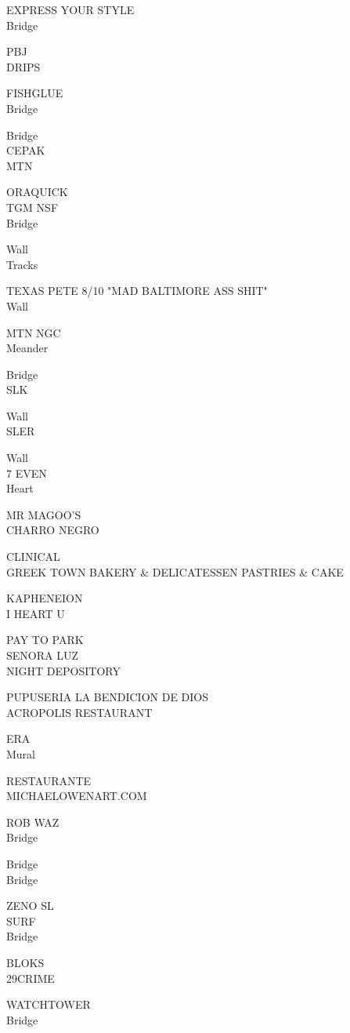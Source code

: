 \documentclass[10pt,letterpaper]{article}
\begin{document}
EXPRESS YOUR STYLE\\
Bridge

PBJ\\
DRIPS

FISHGLUE\\
Bridge

Bridge\\
CEPAK\\
MTN

ORAQUICK\\
TGM NSF\\
Bridge

Wall\\
Tracks

TEXAS PETE 8/10 "MAD BALTIMORE ASS SHIT"\\
Wall

MTN NGC\\
Meander

Bridge\\
SLK

Wall\\
SLER

Wall\\
7 EVEN\\
Heart

MR MAGOO'S\\
CHARRO NEGRO

CLINICAL\\
GREEK TOWN BAKERY \& DELICATESSEN PASTRIES \& CAKE

KAPHENEION\\
I HEART U

PAY TO PARK\\
SENORA LUZ\\
NIGHT DEPOSITORY

PUPUSERIA LA BENDICION DE DIOS\\
ACROPOLIS RESTAURANT

ERA\\
Mural

RESTAURANTE\\
MICHAELOWENART.COM

ROB WAZ\\
Bridge

Bridge\\
Bridge

ZENO SL\\
SURF\\
Bridge

BLOKS\\
29CRIME

WATCHTOWER\\
Bridge
\end{document}
